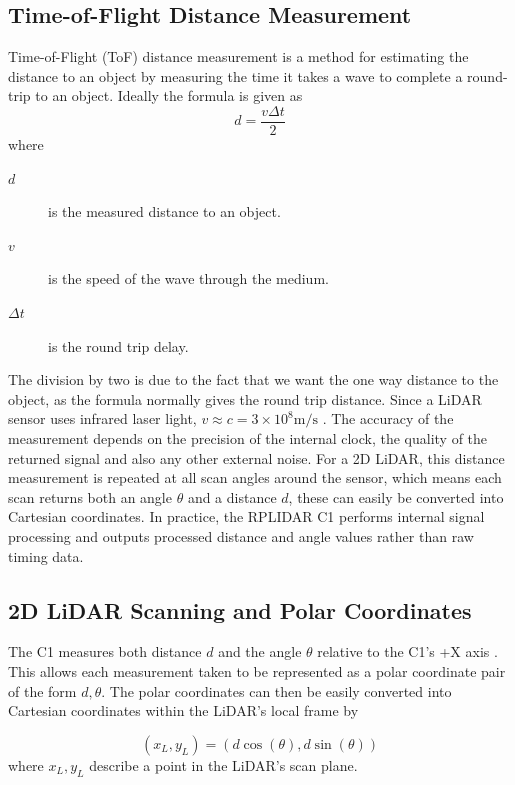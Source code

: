 \subsection{Time-of-Flight Distance Measurement}
Time-of-Flight (ToF) distance measurement is a method for estimating the distance to an object by measuring the time it takes a wave to complete a round-trip to an object.
Ideally the formula is given as 
\begin{equation}
    d = \frac{v \Delta t}{2}
    \label{eq:tof_distance_formula}
\end{equation}
where
\begin{description}
    \item[$d$] is the measured distance to an object.
    \item[$v$] is the speed of the wave through the medium.
    \item[$\Delta t$] is the round trip delay.
\end{description}
The division by two is due to the fact that we want the one way distance to the object, as the formula normally gives the round trip distance. Since a LiDAR sensor uses infrared laser light, \(v\approx c = 3\times10^8\mathrm{m/s}\) \cite{ToFOverview}.
The accuracy of the measurement depends on the precision of the internal clock, the quality of the returned signal and also any other external noise.
For a 2D LiDAR, this distance measurement is repeated at all scan angles around the sensor, which means each scan returns both an angle \(\theta\) and a distance \(d\), these can easily be converted into Cartesian coordinates.
In practice, the RPLIDAR C1 performs internal signal processing and outputs processed distance and angle values rather than raw timing data.

\subsection{2D LiDAR Scanning and Polar Coordinates}
The C1 measures both distance \(d\) and the angle \(\theta\) relative to the C1's +X axis \cite{RPLIDARDatasheet}. This allows each measurement taken to be represented as a polar coordinate pair of the form \(d, \theta\).
The polar coordinates can then be easily converted into Cartesian coordinates within the LiDAR's local frame by

\begin{equation}
    (x_L,y_L)=(d\cos(\theta), d\sin(\theta))
    \label{eq:polar_to_cartesian}
\end{equation}
where \(x_L, y_L\) describe a point in the LiDAR's scan plane.

